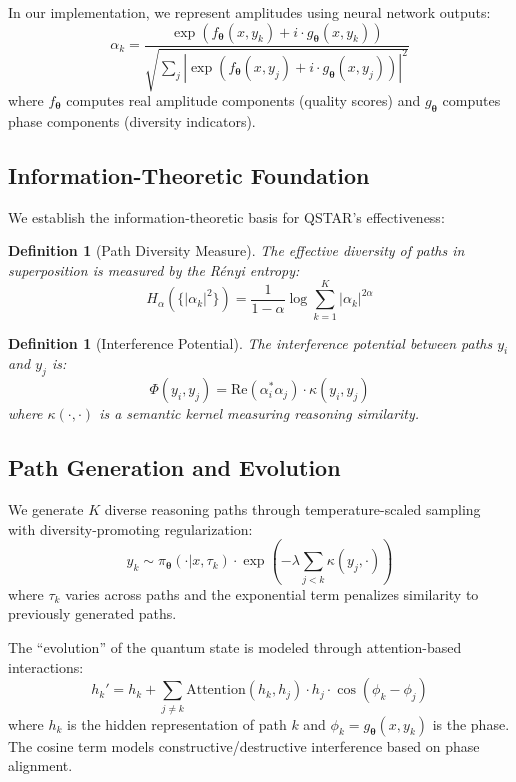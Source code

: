 \documentclass[11pt,a4paper]{article}
\newtheorem{definition}[theorem]{Definition}
\newcommand{\btheta}{\bm{\theta}}
\begin{document}
In our implementation, we represent amplitudes using neural network outputs:
\begin{equation}
    \alpha_k = \frac{\exp(f_\btheta(x, y_k) + i \cdot g_\btheta(x, y_k))}{\sqrt{\sum_j |\exp(f_\btheta(x, y_j) + i \cdot g_\btheta(x, y_j))|^2}}
\end{equation}
where $f_\btheta$ computes real amplitude components (quality scores) and $g_\btheta$ computes phase components (diversity indicators).

\subsection{Information-Theoretic Foundation}

We establish the information-theoretic basis for QSTAR's effectiveness:

\begin{definition}[Path Diversity Measure]
The effective diversity of paths in superposition is measured by the Rényi entropy:
\begin{equation}
    H_\alpha(\{|\alpha_k|^2\}) = \frac{1}{1-\alpha} \log \sum_{k=1}^K |\alpha_k|^{2\alpha}
\end{equation}
\end{definition}

\begin{definition}[Interference Potential]
The interference potential between paths $y_i$ and $y_j$ is:
\begin{equation}
    \Phi(y_i, y_j) = \text{Re}(\alpha_i^* \alpha_j) \cdot \kappa(y_i, y_j)
\end{equation}
where $\kappa(\cdot, \cdot)$ is a semantic kernel measuring reasoning similarity.
\end{definition}

\subsection{Path Generation and Evolution}

We generate $K$ diverse reasoning paths through temperature-scaled sampling with diversity-promoting regularization:
\begin{equation}
    y_k \sim \pi_\btheta(\cdot | x, \tau_k) \cdot \exp\left(-\lambda \sum_{j<k} \kappa(y_j, \cdot)\right)
\end{equation}
where $\tau_k$ varies across paths and the exponential term penalizes similarity to previously generated paths.

The ``evolution'' of the quantum state is modeled through attention-based interactions:
\begin{equation}
    h_k' = h_k + \sum_{j \neq k} \text{Attention}(h_k, h_j) \cdot h_j \cdot \cos(\phi_k - \phi_j)
\end{equation}
where $h_k$ is the hidden representation of path $k$ and $\phi_k = g_\btheta(x, y_k)$ is the phase. The cosine term models constructive/destructive interference based on phase alignment.
\end{document}
